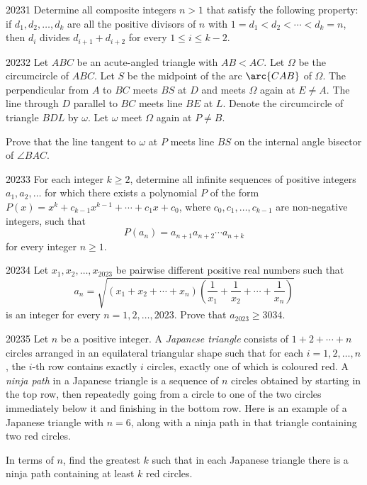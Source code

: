 
\begin{problem}{2023}{1}
Determine all composite integers $n>1$ that satisfy the following property: if $d_1, d_2, \dots, d_k$ are all the positive divisors of $n$ with $1=d_1<d_2<\cdots<d_k=n$, then $d_i$ divides $d_{i+1}+d_{i+2}$ for every $1\leq i\leq k-2$.
\end{problem}

\begin{problem}{2023}{2}
Let $ABC$ be an acute-angled triangle with $AB<AC$. Let $\Omega$ be the circumcircle of $ABC$. Let $S$ be the midpoint of the arc $\arc{CAB}$ of $\Omega$. The perpendicular from $A$ to $BC$ meets $BS$ at $D$ and meets $\Omega$ again at $E\ne A$. The line through $D$ parallel to $BC$ meets line $BE$ at $L$. Denote the circumcircle of triangle $BDL$ by $\omega$. Let $\omega$ meet $\Omega$ again at $P\ne B$.

Prove that the line tangent to $\omega$ at $P$ meets line $BS$ on the internal angle bisector of $\angle BAC$.
\end{problem}

\begin{problem}{2023}{3}
For each integer $k\geq2$, determine all infinite sequences of positive integers $a_1, a_2, \dots$ for which there exists a polynomial $P$ of the form $P(x)=x^k+c_{k-1}x^{k-1}+\cdots+c_1x+c_0$, where $c_0, c_1, \dots, c_{k-1}$ are non-negative integers, such that
\[
    P(a_n)=a_{n+1}a_{n+2}\cdots a_{n+k}
\]
for every integer $n\geq1$.
\end{problem}

\begin{problem}{2023}{4}
Let $x_1, x_2, \dots, x_{2023}$ be pairwise different positive real numbers such that
\[
    a_n=\sqrt{(x_1+x_2+\cdots+x_n)
    \left(\frac1{x_1}+\frac1{x_2}+\cdots+\frac1{x_n}\right)}
\]
is an integer for every $n=1, 2, \dots, 2023$. Prove that $a_{2023}\geq3034$.
\end{problem}

\begin{problem}{2023}{5}
Let $n$ be a positive integer. A \emph{Japanese triangle} consists of $1+2+\cdots+n$ circles arranged in an equilateral triangular shape such that for each $i=1, 2, \dots, n$, the $i$-th row contains exactly $i$ circles, exactly one of which is coloured red. A \emph{ninja path} in a Japanese triangle is a sequence of $n$ circles obtained by starting in the top row, then repeatedly going from a circle to one of the two circles immediately below it and finishing in the bottom row. Here is an example of a Japanese triangle with $n=6$, along with a ninja path in that triangle containing two red circles.



In terms of $n$, find the greatest $k$ such that in each Japanese triangle there is a ninja path containing at least $k$ red circles.
\end{problem}

